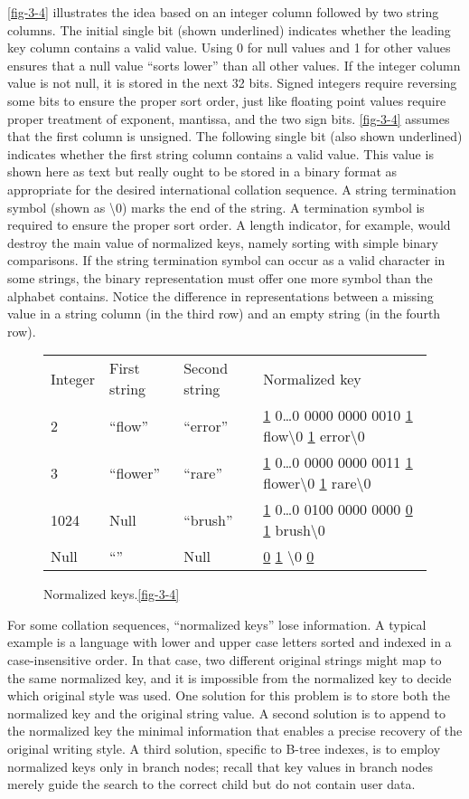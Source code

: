 \autoref{fig-3-4} illustrates the idea based on an integer column followed by
two string columns. The initial single bit (shown underlined) indicates
whether the leading key column contains a valid value. Using 0 for null
values and 1 for other values ensures that a null value ``sorts lower''
than all other values. If the integer column value is not null, it is
stored in the next 32 bits. Signed integers require reversing some bits
to ensure the proper sort order, just like floating point values require
proper treatment of exponent, mantissa, and the two sign bits. \autoref{fig-3-4}
assumes that the first column is unsigned. The following single bit
(also shown underlined) indicates whether the first string column
contains a valid value. This value is shown here as text but really
ought to be stored in a binary format as appropriate for the desired
international collation sequence. A string termination symbol (shown as
\textbackslash{}0) marks the end of the string. A termination symbol is
required to ensure the proper sort order. A length indicator, for
example, would destroy the main value of normalized keys, namely sorting
with simple binary comparisons. If the string termination symbol can
occur as a valid character in some strings, the binary representation
must offer one more symbol than the alphabet contains. Notice the
difference in representations between a missing value in a string column
(in the third row) and an empty string (in the fourth row).

\begin{figure}
  \centering
  \begin{tabular}{llll}
Integer & First string & Second string & Normalized key \\
2 & ``flow'' & ``error'' & \underline{1} 0…0 0000 0000 0010 \underline{1} flow\textbackslash{}0 \underline{1} error\textbackslash{}0 \\
3 & ``flower'' & ``rare'' & \underline{1} 0…0 0000 0000 0011 \underline{1} flower\textbackslash{}0 \underline{1} rare\textbackslash{}0 \\
1024 & Null & ``brush'' & \underline{1} 0…0 0100 0000 0000 \underline{0} \underline{1} brush\textbackslash{}0 \\
Null & ``'' & Null & \underline{0} \underline{1} \textbackslash{}0 \underline{0}
  \end{tabular}
  \caption{Normalized keys.\autoref{fig-3-4}}
\end{figure}

For some collation sequences, ``normalized keys'' lose information. A
typical example is a language with lower and upper case letters sorted
and indexed in a case-insensitive order. In that case, two different
original strings might map to the same normalized key, and it is
impossible from the normalized key to decide which original style was
used. One solution for this problem is to store both the normalized key
and the original string value. A second solution is to append to the
normalized key the minimal information that enables a precise recovery
of the original writing style. A third solution, specific to B-tree
indexes, is to employ normalized keys only in branch nodes; recall that
key values in branch nodes merely guide the search to the correct child
but do not contain user data.

